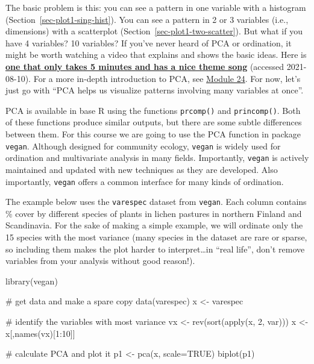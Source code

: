 \documentclass[
  13,
  letterpaper,
]{report}
\newenvironment{Shaded}{\begin{snugshade}}{\end{snugshade}}
\newcommand{\AttributeTok}[1]{\textcolor[rgb]{0.40,0.45,0.13}{#1}}
\newcommand{\CommentTok}[1]{\textcolor[rgb]{0.37,0.37,0.37}{#1}}
\newcommand{\ConstantTok}[1]{\textcolor[rgb]{0.56,0.35,0.01}{#1}}
\newcommand{\DecValTok}[1]{\textcolor[rgb]{0.68,0.00,0.00}{#1}}
\newcommand{\FunctionTok}[1]{\textcolor[rgb]{0.28,0.35,0.67}{#1}}
\newcommand{\NormalTok}[1]{\textcolor[rgb]{0.00,0.23,0.31}{#1}}
\newcommand{\OtherTok}[1]{\textcolor[rgb]{0.00,0.23,0.31}{#1}}
\newcommand{\SpecialCharTok}[1]{\textcolor[rgb]{0.37,0.37,0.37}{#1}}
\begin{document}
The basic problem is this: you can see a pattern in one variable with a
histogram (Section~\ref{sec-plot1-sing-hist}). You can see a pattern in
2 or 3 variables (i.e., dimensions) with a scatterplot
(Section~\ref{sec-plot1-two-scatter}). But what if you have 4 variables?
10 variables? If you've never heard of PCA or ordination, it might be
worth watching a video that explains and shows the basic ideas. Here is
\href{https://www.youtube.com/watch?v=HMOI_lkzW08}{\textbf{one that only
takes 5 minutes and has a nice theme song}} (accessed 2021-08-10). For a
more in-depth introduction to PCA, see \href{@sec-24-pca}{Module 24}.
For now, let's just go with ``PCA helps us visualize patterns involving
many variables at once''.

PCA is available in base R using the functions \texttt{prcomp()} and
\texttt{princomp()}. Both of these functions produce similar outputs,
but there are some subtle differences between them. For this course we
are going to use the PCA function in package \texttt{vegan}. Although
designed for community ecology, \texttt{vegan} is widely used for
ordination and multivariate analysis in many fields. Importantly,
\texttt{vegan} is actively maintained and updated with new techniques as
they are developed. Also importantly, \texttt{vegan} offers a common
interface for many kinds of ordination.

The example below uses the \texttt{varespec} dataset from
\texttt{vegan}. Each column contains \% cover by different species of
plants in lichen pastures in northern Finland and Scandinavia. For the
sake of making a simple example, we will ordinate only the 15 species
with the most variance (many species in the dataset are rare or sparse,
so including them makes the plot harder to interpret\ldots in ``real
life'', don't remove variables from your analysis without good reason!).

\begin{Shaded}
\begin{Highlighting}[]
\FunctionTok{library}\NormalTok{(vegan)}
\end{Highlighting}
\end{Shaded}

\begin{Shaded}
\begin{Highlighting}[]
\CommentTok{\# get data and make a spare copy}
\FunctionTok{data}\NormalTok{(varespec)}
\NormalTok{x }\OtherTok{\textless{}{-}}\NormalTok{ varespec}

\CommentTok{\# identify the variables with most variance}
\NormalTok{vx }\OtherTok{\textless{}{-}} \FunctionTok{rev}\NormalTok{(}\FunctionTok{sort}\NormalTok{(}\FunctionTok{apply}\NormalTok{(x, }\DecValTok{2}\NormalTok{, var)))}
\NormalTok{x }\OtherTok{\textless{}{-}}\NormalTok{ x[,}\FunctionTok{names}\NormalTok{(vx)[}\DecValTok{1}\SpecialCharTok{:}\DecValTok{10}\NormalTok{]]}

\CommentTok{\# calculate PCA and plot it}
\NormalTok{p1 }\OtherTok{\textless{}{-}} \FunctionTok{pca}\NormalTok{(x, }\AttributeTok{scale=}\ConstantTok{TRUE}\NormalTok{)}
\FunctionTok{biplot}\NormalTok{(p1)}
\end{Highlighting}
\end{Shaded}
\end{document}

